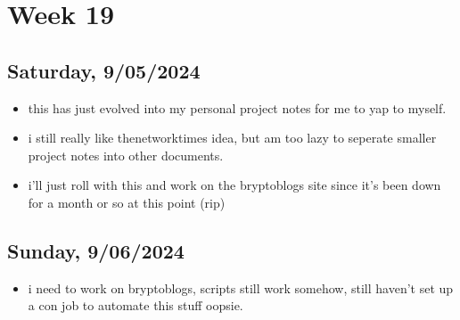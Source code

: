 \newpage
\section{Week 19}

\subsection*{Saturday, 9/05/2024}
\begin{itemize}
    \item this has just evolved into my personal project notes for me to yap to
        myself.
    \item i still really like thenetworktimes idea, but am too lazy to seperate
        smaller project notes into other documents.
    \item i'll just roll with this and work on the bryptoblogs site since it's
        been down for a month or so at this point (rip)
\end{itemize}

\subsection*{Sunday, 9/06/2024}
\begin{itemize}
    \item i need to work on bryptoblogs, scripts still work somehow, still
        haven't set up a con job to automate this stuff oopsie.
\end{itemize}
